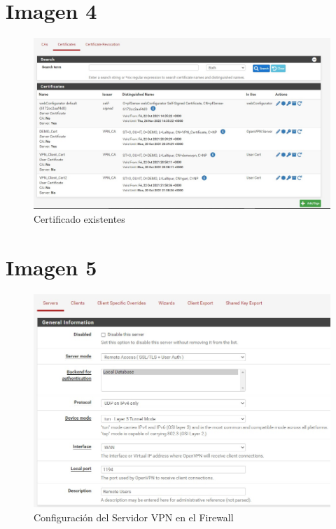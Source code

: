 \documentclass[12pt,letterspaper]{report}
\begin{document}
\chapter*{Imagen 4}
\vspace {0.3cm}
\begin{figure}[htb]
\centering
\includegraphics[scale=0.5]{Img4.jpg}
\caption{{Certificado existentes}}
\end{figure}\par
\vspace {0.1cm}



\chapter*{Imagen 5}
\vspace {0.3cm}
\begin{figure}[htb]
\centering
\includegraphics[scale=0.5]{Img5.jpg}
\caption{{Configuración del Servidor VPN en el Firewall}}
\end{figure}\par
\vspace {0.1cm}
\end{document}
